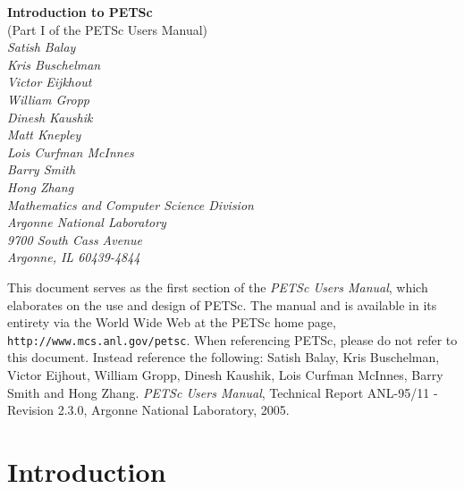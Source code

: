 \documentclass[twoside,12pt]{../sty/report_petsc}
\begin{document}
\begin{center}
$\!$
\vspace{1.0cm}
\thispagestyle{empty}

{\huge \bf Introduction to PETSc}\\ 
\vspace{0.5cm}
{\LARGE (Part I of the PETSc Users Manual)} \\
\vspace{1.5cm}
{\large \em Satish Balay\\Kris Buschelman\\Victor Eijkhout\\William Gropp\\Dinesh Kaushik\\Matt Knepley\\Lois Curfman McInnes\\Barry Smith\\Hong Zhang\\
\medskip \medskip
Mathematics and Computer Science Division\\
Argonne National Laboratory\\
9700 South Cass Avenue\\
Argonne, IL 60439-4844\\
}
\end{center}

\vspace{1.0cm}



 This document serves as the first section of the {\em PETSc Users
Manual}, which elaborates on the use and design of PETSc. The
manual and is available in its entirety via the World Wide Web at
the PETSc home page, {\tt http://www.mcs.anl.gov/petsc}.
When referencing PETSc, please do 
not refer to this document. Instead reference the following: Satish
Balay, Kris Buschelman, Victor Eijhout, William Gropp, Dinesh Kaushik, 
Lois Curfman McInnes, Barry Smith and Hong Zhang.  {\em
PETSc Users Manual}, Technical Report ANL-95/11 - Revision 2.3.0,
Argonne National Laboratory, 2005.

%
\newpage


\newpage
\section{Introduction}

\end{document}
